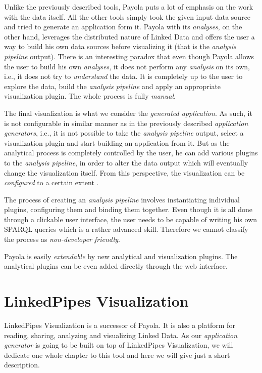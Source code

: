 Unlike the previously described tools, Payola puts a lot of emphasis on the work with the data itself. All the other tools simply took the given input data source and tried to generate an application form it. Payola with its \emph{analyses}, on the other hand, leverages the distributed nature of Linked Data and offers the user a way to build his own data sources before visualizing it (that is the \emph{analysis pipeline} output). There is an interesting paradox that even though Payola allows the user to build his own \emph{analyses}, it does not perform any \emph{analysis} on its own, i.e., it does not try to \emph{understand} the data. It is completely up to the user to explore the data, build the \emph{analysis pipeline} and apply an appropriate visualization plugin. The whole process is fully \emph{manual}.

The final visualization is what we consider the \emph{generated application}. As such, it is not configurable in similar manner as in the previously described \emph{application generators}, i.e., it is not possible to take the \emph{analysis pipeline} output, select a visualization plugin and start building an application from it. But as the analytical process is completely controlled by the user, he can add various plugins to the \emph{analysis pipeline}, in order to alter the data output which will eventually change the visualization itself. From this perspective, the visualization can be \emph{configured} to a certain extent .

The process of creating an \emph{analysis pipeline} involves instantiating individual plugins, configuring them and binding them together. Even though it is all done through a clickable user interface, the user needs to be capable of writing his own SPARQL queries which is a rather advanced skill. Therefore we cannot classify the process as \emph{non-developer friendly}.

Payola is easily \emph{extendable} by new analytical and visualization plugins. The analytical plugins can be even added directly through the web interface.

\section{LinkedPipes Visualization}

LinkedPipes Visualization \cite{linked_pipes_visualization} is a successor of Payola. It is also a platform for reading, sharing, analyzing and visualizing Linked Data. As our \emph{application generator} is going to be built on top of LinkedPipes Visualization, we will dedicate one whole chapter to this tool and here we will give just a short description.

